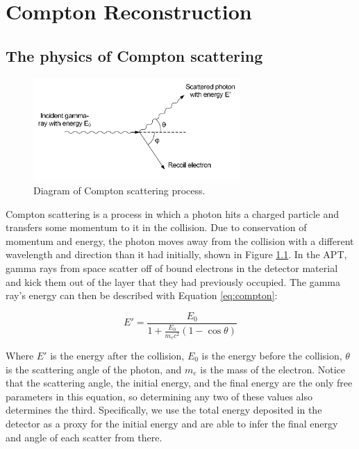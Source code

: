 %
\chapter{Compton Reconstruction}

\section{The physics of Compton scattering}

\begin{figure}
    \centering
    \includegraphics[width=0.7\textwidth]{Compton_scatter.png}
    \caption{Diagram of Compton scattering process. \cite{comptonThesis}}
    \label{fig:compton_scatter}
\end{figure}

Compton scattering is a process in which a photon hits a charged particle and transfers some momentum to it in the collision. Due to conservation of momentum and energy, the photon moves away from the collision with a different wavelength and direction than it had initially, shown in Figure \ref{fig:compton_scatter}. In the APT, gamma rays from space scatter off of bound electrons in the detector material and kick them out of the layer that they had previously occupied. The gamma ray's energy can then be described with Equation \ref{eq:compton}:

\begin{equation}
    \label{eq:compton}E' = \frac{E_0}{1+\frac{E_0}{m_ec^2}(1-\cos\theta)}
\end{equation}

Where $E'$ is the energy after the collision, $E_0$ is the energy before the collision, $\theta$ is the scattering angle of the photon, and $m_e$ is the mass of the electron. Notice that the scattering angle, the initial energy, and the final energy are the only free parameters in this equation, so determining any two of these values also determines the third. Specifically, we use the total energy deposited in the detector as a proxy for the initial energy and are able to infer the final energy and angle of each scatter from there.

